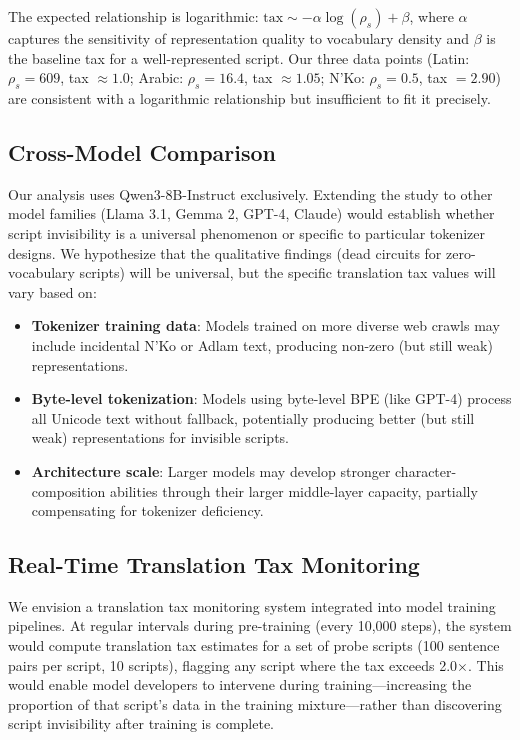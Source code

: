 \documentclass[11pt]{article}
\begin{document}
The expected relationship is logarithmic: $\text{tax} \sim -\alpha \log(\rho_s) + \beta$, where $\alpha$ captures the sensitivity of representation quality to vocabulary density and $\beta$ is the baseline tax for a well-represented script.
Our three data points (Latin: $\rho_s = 609$, tax $\approx 1.0$; Arabic: $\rho_s = 16.4$, tax $\approx 1.05$; N'Ko: $\rho_s = 0.5$, tax $= 2.90$) are consistent with a logarithmic relationship but insufficient to fit it precisely.

\subsection{Cross-Model Comparison}

Our analysis uses Qwen3-8B-Instruct exclusively.
Extending the study to other model families (Llama 3.1, Gemma 2, GPT-4, Claude) would establish whether script invisibility is a universal phenomenon or specific to particular tokenizer designs.
We hypothesize that the qualitative findings (dead circuits for zero-vocabulary scripts) will be universal, but the specific translation tax values will vary based on:
\begin{itemize}
\item \textbf{Tokenizer training data}: Models trained on more diverse web crawls may include incidental N'Ko or Adlam text, producing non-zero (but still weak) representations.
\item \textbf{Byte-level tokenization}: Models using byte-level BPE (like GPT-4) process all Unicode text without fallback, potentially producing better (but still weak) representations for invisible scripts.
\item \textbf{Architecture scale}: Larger models may develop stronger character-composition abilities through their larger middle-layer capacity, partially compensating for tokenizer deficiency.
\end{itemize}

\subsection{Real-Time Translation Tax Monitoring}

We envision a translation tax monitoring system integrated into model training pipelines.
At regular intervals during pre-training (every 10,000 steps), the system would compute translation tax estimates for a set of probe scripts (100 sentence pairs per script, 10 scripts), flagging any script where the tax exceeds 2.0$\times$.
This would enable model developers to intervene during training---increasing the proportion of that script's data in the training mixture---rather than discovering script invisibility after training is complete.
\end{document}
